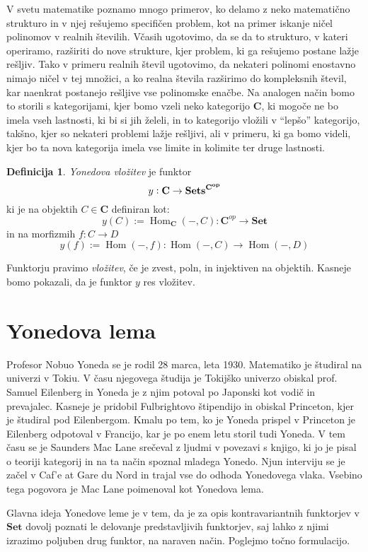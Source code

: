 \documentclass[12pt,a4paper]{book}
\theoremstyle{definition}
\newtheorem{definicija}{Definicija}[chapter]
\theoremstyle{plain}
\theoremstyle{definition}
\theoremstyle{remark}
\newcommand{\cat}[1]{\textbf{#1}}
\DeclareMathOperator{\Hom}{Hom}
\begin{document}
V svetu matematike poznamo mnogo primerov, ko delamo z neko matematično strukturo in v njej rešujemo specifičen problem, kot na primer iskanje ničel polinomov v realnih številih. Včasih ugotovimo, da se da to strukturo, v kateri operiramo, razširiti do nove strukture, kjer problem, ki ga rešujemo postane lažje rešljiv. Tako v primeru realnih števil ugotovimo, da nekateri polinomi enostavno nimajo ničel v tej množici, a ko realna števila razširimo do kompleksnih števil, kar naenkrat postanejo rešljive vse polinomske enačbe. Na analogen način bomo to storili s kategorijami, kjer bomo vzeli neko kategorijo $\cat{C}$, ki mogoče ne bo imela vseh lastnosti, ki bi si jih želeli, in to kategorijo vložili v "`lepšo"' kategorijo, takšno, kjer so nekateri problemi lažje rešljivi, ali v primeru, ki ga bomo videli, kjer bo ta nova kategorija imela vse limite in kolimite ter druge lastnosti. 


\begin{definicija} \emph{Yonedova vložitev} je funktor 
$$y : \bf{C} \to \bf{Sets}^{\bf{C}^{op}}$$
ki je na objektih $C \in \cat{C}$ definiran kot:
$$y(C) := \Hom_{\cat{C}}(-, C) : \cat{C}^{op} \to \cat{Set}$$ 
in na morfizmih $f : C \to D$
$$y(f) := \Hom(-,f) : \Hom(-,C) \to \Hom(-,D)$$
\end{definicija}

Funktorju pravimo \emph{vložitev}, če je zvest, poln, in injektiven na objektih. Kasneje bomo pokazali, da je funktor $y$ res vložitev. 

\section{Yonedova lema}

Profesor Nobuo Yoneda se je rodil 28 marca, leta 1930. Matematiko je študiral na univerzi v Tokiu. V času njegovega študija je Tokijško univerzo obiskal prof. Samuel Eilenberg in Yoneda je z njim potoval po Japonski kot vodič in prevajalec. Kasneje je pridobil Fulbrightovo štipendijo in obiskal Princeton, kjer je študiral pod Eilenbergom. Kmalu po tem, ko je Yoneda prispel v Princeton je Eilenberg odpotoval v Francijo, kar je po enem letu storil tudi Yoneda. V tem času se je Saunders Mac Lane srečeval z ljudmi v povezavi s knjigo, ki jo je pisal o teoriji kategorij in na ta način spoznal mladega Yonedo. Njun interviju se je začel v Caf'e at Gare du Nord in trajal vse do odhoda Yonedovega vlaka. Vsebino tega pogovora je Mac Lane poimenoval kot Yonedova lema.


Glavna ideja Yonedove leme je v tem, da je za opis kontravariantnih funktorjev v $\cat{Set}$ dovolj poznati le delovanje predstavljivih funktorjev, saj lahko z njimi izrazimo poljuben drug funktor, na naraven način. Poglejmo točno formulacijo.
\end{document}
